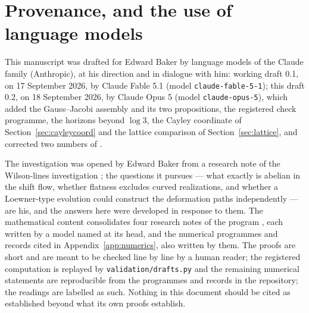 \section{Provenance, and the use of language models}\label{app:provenance}

This manuscript was drafted for Edward Baker by language models of the Claude
family (Anthropic), at his direction and in dialogue with him: working draft
0.1, on 17 September 2026, by Claude Fable 5.1 (model
\texttt{claude-fable-5-1}); this draft 0.2, on 18 September 2026, by Claude
Opus 5 (model \texttt{claude-opus-5}), which added the Gauss--Jacobi assembly
and its two propositions, the registered check programme, the horizons beyond
$\log3$, the Cayley coordinate of Section~\ref{sec:cayleycoord} and the lattice
comparison of Section~\ref{sec:lattice}, and corrected two numbers of
\cite{ContractionNote}.

The investigation was opened by Edward Baker from a research note of the
Wilson-lines investigation \cite{LoewnerNote}; the questions it pursues --- what
exactly is abelian in the shift flow, whether flatness excludes curved
realizations, and whether a Loewner-type evolution could construct the
deformation paths independently --- are his, and the answers here were developed
in response to them. The mathematical content consolidates four research notes
of the program \cite{LoewnerNote,OpeningNote,ContractionNote,RegisteredNote},
each written by a model named at its head, and the numerical programmes and
records cited in Appendix~\ref{app:numerics}, also written by them. The proofs
are short and are meant to be checked line by line by a human reader; the
registered computation is replayed by \texttt{validation/drafts.py} and the
remaining numerical statements are reproducible from the programmes and records
in the repository; the readings are labelled as such. Nothing in this document
should be cited as established beyond what its own proofs establish.
